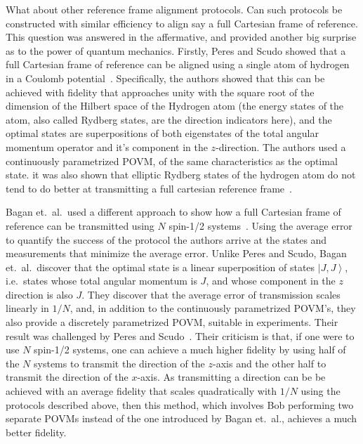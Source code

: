 \documentclass{article}
\newcommand{\ket}[1]{\left|#1\right\rangle}
\begin{document}
What about other reference frame alignment protocols.  Can such protocols be constructed with similar efficiency to align say a full Cartesian frame of reference.  This question was answered in the affermative, and provided another big surprise as to the power of quantum mechanics.  Firstly, Peres and Scudo showed that a full Cartesian frame of reference can be aligned using a single atom of hydrogen in a Coulomb potential~\cite{PS01b}.  Specifically, the authors showed that this can be achieved with fidelity that approaches unity with the square root of the dimension of the Hilbert space of the Hydrogen atom (the energy states of the atom, also called Rydberg states, are the direction indicators here), and the optimal states are superpositions of both eigenstates of the total angular momentum operator and it's component in the $z$-direction.  The authors used a continuously parametrized POVM, of the same characteristics as the optimal state.  it was also shown that elliptic Rydberg states of the hydrogen atom do not tend to do better at transmitting a full cartesian reference frame~\cite{LPT03}.

Bagan et.~al.~used a different approach to show how a full Cartesian frame of reference can be transmitted using $N$ spin-1/2 systems~\cite{BBM01}.  Using the average error to quantify the success of the protocol the authors arrive at the states and measurements that minimize the average error.  Unlike Peres and Scudo, Bagan et.~al.~discover that the optimal state is a linear superposition of states $\ket{J,J}$, i.e.~states whose total angular momentum is $J$, and whose component in the $z$ direction is also $J$.  They discover that the average error of transmission scales linearly in $1/N$, and, in addition to the continuously parametrized POVM's, they also provide a discretely parametrized POVM, suitable in experiments.  Their result was challenged by Peres and Scudo~\cite{PS02a,PS02b}.  Their criticism is that, if one were to use $N$ spin-1/2 systems, one can achieve a much higher fidelity by using half of the $N$ systems to transmit the direction of the $z$-axis and the other half to transmit the direction of the $x$-axis.  As transmitting a direction can be be achieved with an average fidelity that scales quadratically with $1/N$ using the protocols described above,  then this method, which involves Bob performing two separate POVMs instead of the one introduced by Bagan et.~al., achieves a much better fidelity.
\end{document}

